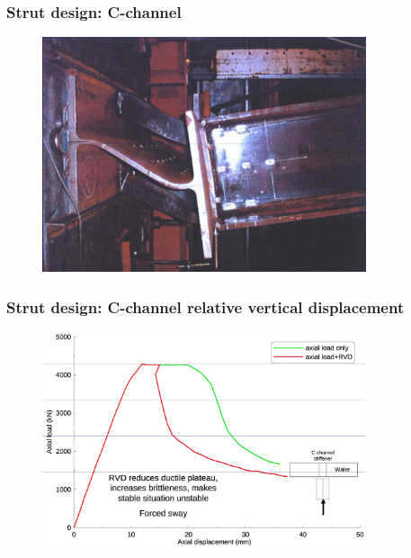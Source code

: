 \documentclass[notes]{beamer}
\begin{document}
\begin{frame}
\frametitle{Strut design: C-channel}
\begin{figure}[ht]
	\centering
	\includegraphics[width=0.85\textwidth]{figs/c-channel-stiffened.png}
\end{figure}
\end{frame}

\begin{frame}
\frametitle{Strut design: C-channel relative vertical displacement}
\begin{figure}[ht]
	\centering
	\includegraphics[width=0.85\textwidth]{figs/c-channel-effect-relative-vertical-disp.png}
\end{figure}
\end{frame}
\end{document}
